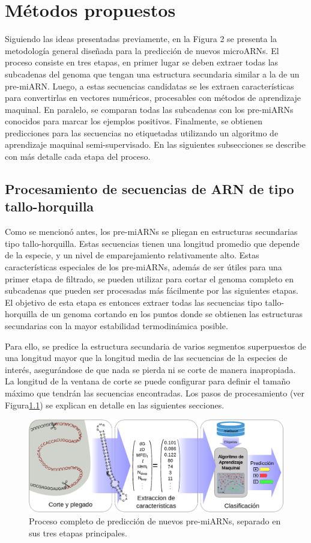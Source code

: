 \chapter{Métodos propuestos}
Siguiendo las ideas presentadas previamente, en la Figura 2 se presenta la metodología general diseñada para la predicción de nuevos microARNs. El proceso
consiste en tres etapas, en primer lugar se deben extraer todas las subcadenas del genoma que tengan una estructura secundaria similar a la de un pre-miARN.
Luego, a estas secuencias candidatas se les extraen características para convertirlas en vectores numéricos, procesables con métodos de aprendizaje maquinal. En
paralelo, se comparan todas las subcadenas con los pre-miARNs conocidos para marcar los ejemplos positivos. Finalmente, se obtienen predicciones para las
secuencias no etiquetadas utilizando un algoritmo de aprendizaje maquinal semi-supervisado. En las siguientes subsecciones se describe con más detalle cada
etapa del proceso.

\section{Procesamiento de secuencias de ARN de tipo tallo-horquilla}
Como se mencionó antes, los pre-miARNs se pliegan en estructuras secundarias tipo tallo-horquilla. Estas secuencias tienen una longitud promedio que depende de
la especie, y un nivel de emparejamiento relativamente alto. Estas características especiales de los pre-miARNs, además de ser útiles para una primer etapa de
filtrado, se pueden utilizar para cortar el genoma completo en subcadenas que pueden ser procesadas más fácilmente por las siguientes etapas. El objetivo de
esta etapa es entonces extraer todas las secuencias tipo tallo-horquilla de un genoma cortando en los puntos donde se obtienen las estructuras secundarias con
la mayor estabilidad termodinámica posible.

Para ello, se predice la estructura secundaria de varios segmentos superpuestos de una longitud mayor que la longitud media de las secuencias de la especies
de interés, asegurándose de que nada se pierda ni se corte de manera inapropiada. La longitud de la ventana de corte se puede configurar para definir el tamaño
máximo que tendrán las secuencias encontradas. Los pasos de procesamiento (ver Figura\ref{fig:esquema}) se explican en detalle en las siguientes secciones.

\begin{figure}[tpb]
	\centering
	\includegraphics[width=\textwidth]{fig/diagrama.eps}
	\caption[Etapas de la predicción de microARN]{Proceso completo de predicción de nuevos pre-miARNs, separado en sus tres etapas principales.}
	\label{fig:esquema}
\end{figure}

